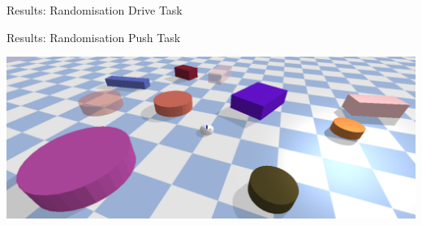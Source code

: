 \begin{frame}[fragile]{Results: Randomisation Drive Task} %
\begin{figure}
  \centering
  \quad
\end{figure}
\vspace{-0.7cm}
\begin{figure}
  \centering
  \quad
\end{figure}
\end{frame}


\begin{frame}[fragile]{Results: Randomisation Push Task} %
\begin{center}
\includegraphics[width=1.0\textwidth]{figures/results/random_1}
\end{center}
\end{frame}


